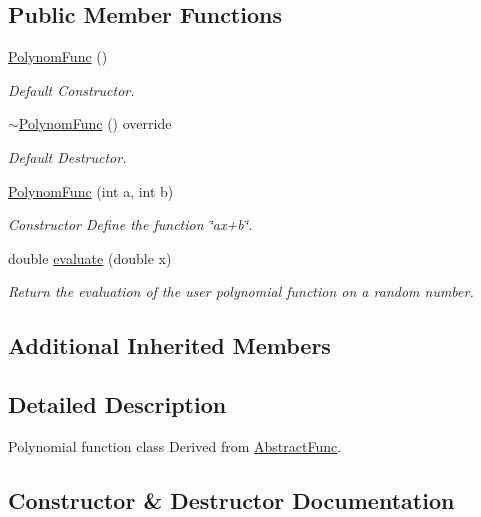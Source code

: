 \subsection*{Public Member Functions}
\begin{DoxyCompactItemize}
\item 
\mbox{\label{classPolynomFunc_a49ac41ced1a0d6479edf44edbe086312}} 
\hyperlink{classPolynomFunc_a49ac41ced1a0d6479edf44edbe086312}{Polynom\+Func} ()
\begin{DoxyCompactList}\small\item\em Default Constructor. \end{DoxyCompactList}\item 
\mbox{\label{classPolynomFunc_aed277f31c0410e877a10b5f7298e281c}} 
\hyperlink{classPolynomFunc_aed277f31c0410e877a10b5f7298e281c}{$\sim$\+Polynom\+Func} () override
\begin{DoxyCompactList}\small\item\em Default Destructor. \end{DoxyCompactList}\item 
\hyperlink{classPolynomFunc_a8711146c4bb599be120c35b8404029a9}{Polynom\+Func} (int a, int b)
\begin{DoxyCompactList}\small\item\em Constructor Define the function \char`\"{}ax+b\char`\"{}. \end{DoxyCompactList}\item 
double \hyperlink{classPolynomFunc_a9908fc0cf0686123a98d3186d481fa6f}{evaluate} (double x)
\begin{DoxyCompactList}\small\item\em Return the evaluation of the user polynomial function on a random number. \end{DoxyCompactList}\end{DoxyCompactItemize}
\subsection*{Additional Inherited Members}


\subsection{Detailed Description}
Polynomial function class Derived from \hyperlink{classAbstractFunc}{Abstract\+Func}. 

\subsection{Constructor \& Destructor Documentation}
\mbox{\label{classPolynomFunc_a8711146c4bb599be120c35b8404029a9}} 
